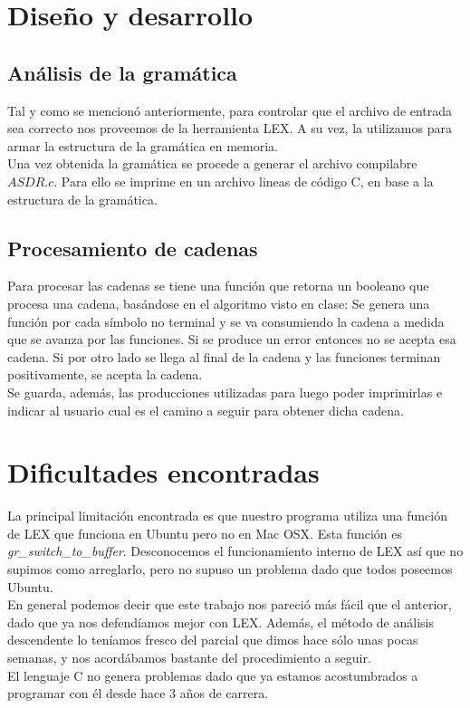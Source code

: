 \documentclass{article}
\begin{document}
\section{Dise\~no y desarrollo}
\subsection{An\'alisis de la gram\'atica}
Tal y como se mencion\'o anteriormente, para controlar que el archivo de entrada sea correcto nos proveemos de la herramienta LEX. A su vez, la utilizamos para armar la estructura de la gram\'atica en memoria.\\
Una vez obtenida la gram\'atica se procede a generar el archivo compilabre $ASDR.c$. Para ello se imprime en un archivo lineas de c\'odigo C, en base a la estructura de la gram\'atica.
\subsection{Procesamiento de cadenas}

Para procesar las cadenas se tiene una funci\'on que retorna un booleano que procesa una cadena, bas\'andose en el algoritmo visto en clase: Se genera una funci\'on por cada s\'imbolo no terminal y se va consumiendo la cadena a medida que se avanza por las funciones. Si se produce un error entonces no se acepta esa cadena. Si por otro lado se llega al final de la cadena y las funciones terminan positivamente, se acepta la cadena.\\
Se guarda, adem\'as, las producciones utilizadas para luego poder imprimirlas e indicar al usuario cual es el camino a seguir para obtener dicha cadena.

\section{Dificultades encontradas}

La principal limitaci\'on encontrada es que nuestro programa utiliza una funci\'on de LEX que funciona en Ubuntu pero no en Mac OSX. Esta funci\'on es \textit{gr\_switch\_to\_buffer}. Desconocemos el funcionamiento interno de LEX as\'i que no supimos como arreglarlo, pero no supuso un problema dado que todos poseemos Ubuntu. \\
En general podemos decir que este trabajo nos pareci\'o m\'as f\'acil que el anterior, dado que ya nos defend\'iamos mejor con LEX. Adem\'as, el m\'etodo de an\'alisis descendente lo ten\'iamos fresco del parcial que dimos hace s\'olo unas pocas semanas, y nos acord\'abamos bastante del procedimiento a seguir.\\
El lenguaje C no genera problemas dado que ya estamos acostumbrados a programar con \'el desde hace 3 a\~nos de carrera.
\end{document}
